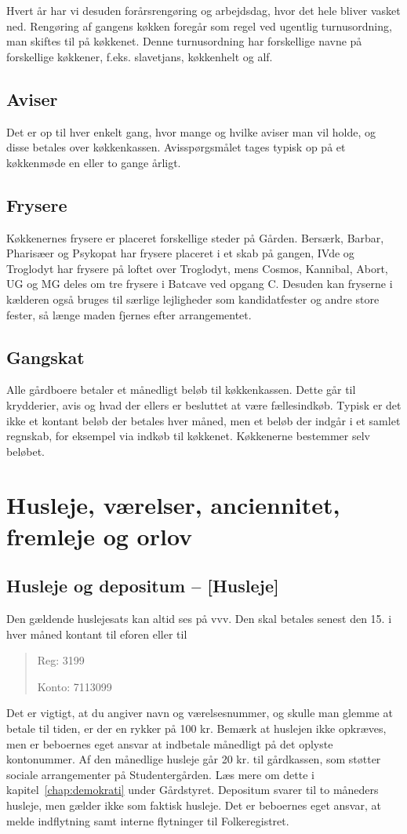 \documentclass[11pt,article,twoside,openany,danish,extrafontsizes]{memoir} %
\begin{document}
Hvert år har vi desuden forårsrengøring og arbejdsdag, hvor det hele bliver vasket ned. Rengøring af gangens køkken foregår som regel ved ugentlig turnusordning, man skiftes til på køkkenet. Denne turnusordning har forskellige navne på forskellige køkkener, f.eks. slavetjans, køkkenhelt og alf.

\subsection{Aviser}
Det er op til hver enkelt gang, hvor mange og hvilke aviser man vil holde, og disse betales over køkkenkassen. Avisspørgsmålet tages typisk op på et køkkenmøde en eller to gange årligt.

\subsection{Frysere}
Køkkenernes frysere er placeret forskellige steder på Gården. Bersærk, Barbar, Pharisæer og Psykopat har frysere placeret i et skab på gangen, IVde og Troglodyt har frysere på loftet over Troglodyt, mens Cosmos, Kannibal, Abort, UG og MG deles om tre frysere i Batcave ved opgang C. Desuden kan fryserne i kælderen også bruges til særlige lejligheder som kandidatfester og andre store fester, så længe maden fjernes efter arrangementet.

\subsection{Gangskat}
Alle gårdboere betaler et månedligt beløb til køkkenkassen. Dette går til krydderier, avis og hvad der ellers er besluttet at være fællesindkøb. Typisk er det ikke et kontant beløb der betales hver måned, men et beløb der indgår i et samlet regnskab, for eksempel via indkøb til køkkenet. Køkkenerne bestemmer selv beløbet.




\section{Husleje, værelser, anciennitet, fremleje og orlov}

\subsection{Husleje og depositum -- [Husleje]}
Den gældende huslejesats kan altid ses på vvv. Den skal betales  senest den 15. i hver måned kontant til eforen eller til
\begin{quote} \small
Reg: 3199

Konto: 7113099
\end{quote}
Det er vigtigt, at du angiver navn og værelsesnummer, og skulle man glemme at betale til tiden, er der en rykker på 100 kr. Bemærk at huslejen ikke opkræves, men er beboernes eget ansvar at indbetale månedligt på det oplyste kontonummer. Af den månedlige husleje går 20 kr. til gårdkassen, som støtter sociale arrangementer på Studentergården. Læs mere om dette i kapitel~\ref{chap:demokrati} under Gårdstyret. Depositum svarer til to måneders husleje, men gælder ikke som faktisk husleje. Det er beboernes eget ansvar, at melde indflytning samt interne flytninger til Folkeregistret.
\end{document}
